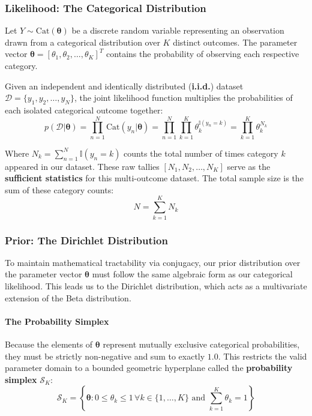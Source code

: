 \documentclass{article}
\begin{document}
\subsubsection{Likelihood: The Categorical Distribution}
Let $Y \sim \text{Cat}(\boldsymbol{\theta})$ be a discrete random variable representing an observation drawn from a categorical distribution over $K$ distinct outcomes. The parameter vector $\boldsymbol{\theta} = [\theta_1, \theta_2, \dots, \theta_K]^T$ contains the probability of observing each respective category. 

Given an independent and identically distributed (\textbf{i.i.d.}) dataset $\mathcal{D} = \{y_1, y_2, \dots, y_N\}$, the joint likelihood function multiplies the probabilities of each isolated categorical outcome together:
\begin{equation}
p(\mathcal{D}|\boldsymbol{\theta}) = \prod_{n=1}^N \text{Cat}(y_n|\boldsymbol{\theta}) = \prod_{n=1}^N \prod_{k=1}^K \theta_k^{\mathbb{I}(y_n = k)} = \prod_{k=1}^K \theta_k^{N_k}
\end{equation}

Where $N_k = \sum_{n=1}^N \mathbb{I}(y_n = k)$ counts the total number of times category $k$ appeared in our dataset. These raw tallies $[N_1, N_2, \dots, N_K]$ serve as the \textbf{sufficient statistics} for this multi-outcome dataset. The total sample size is the sum of these category counts:
\begin{equation}
N = \sum_{k=1}^K N_k
\end{equation}

\subsubsection{Prior: The Dirichlet Distribution}
To maintain mathematical tractability via conjugacy, our prior distribution over the parameter vector $\boldsymbol{\theta}$ must follow the same algebraic form as our categorical likelihood. This leads us to the Dirichlet distribution, which acts as a multivariate extension of the Beta distribution.

\paragraph{The Probability Simplex}
Because the elements of $\boldsymbol{\theta}$ represent mutually exclusive categorical probabilities, they must be strictly non-negative and sum to exactly $1.0$. This restricts the valid parameter domain to a bounded geometric hyperplane called the \textbf{probability simplex} $\mathcal{S}_K$:
\begin{equation}
\mathcal{S}_K = \left\{ \boldsymbol{\theta} : 0 \le \theta_k \le 1 \, \forall k \in \{1,\dots,K\} \text{ and } \sum_{k=1}^K \theta_k = 1 \right\}
\end{equation}
\end{document}
